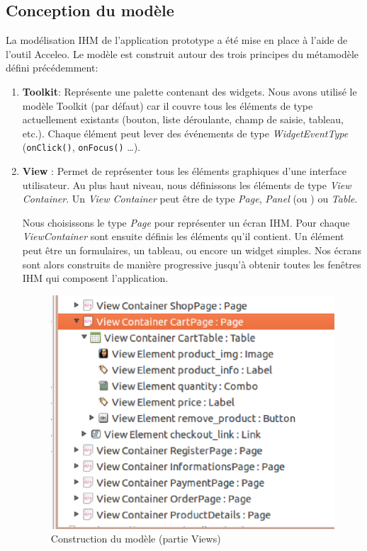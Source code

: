 \subsection{Conception du modèle}
La modélisation \textsc{IHM} de l'application prototype \kwplay{} a été mise en place à l'aide de l'outil Acceleo. Le modèle est construit autour des trois principes du métamodèle défini précédemment:
\begin{enumerate}
\item \textbf{Toolkit}: Représente une palette contenant des widgets. Nous avons utilisé le modèle Toolkit (par défaut) car il couvre tous les éléments de type   actuellement existants (bouton, liste déroulante, champ de saisie, tableau, etc.). Chaque élément  peut lever des événements de type \textit{WidgetEventType} (\verb+onClick()+, \verb+onFocus()+ \dots). 

\item \textbf{View} : Permet de représenter tous les éléments graphiques d'une interface utilisateur. Au plus haut niveau, nous définissons les éléments de type \textit{View Container}. Un \textit{View Container} peut être de type \textit{Page}, \textit{Panel} (ou ) ou \textit{Table}. 

Nous choisissons le type \textit{Page} pour représenter un écran \textsc{IHM}. Pour chaque \textit{ViewContainer} sont ensuite définis les éléments qu'il contient. Un élément peut être un formulaires, un tableau, ou encore un widget simples. Nos écrans sont alors construits de manière progressive jusqu'à obtenir toutes les fenêtres \textsc{IHM} qui composent l'application.
\begin{figure}[H]
  \centering
  \includegraphics[scale=.4]{img/views.eps}
  \caption{Construction du modèle (partie Views)}
  \label{fig:view}
\end{figure}


\end{enumerate}
